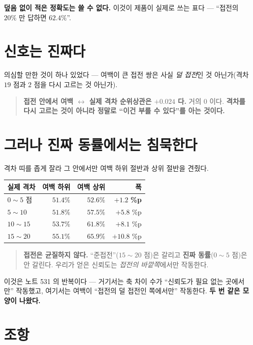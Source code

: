 \documentclass[11pt]{article}
\begin{document}
\textbf{덮음 없이 적은 정확도는 쓸 수 없다.} 이것이 제품이 실제로 쓰는 표다
--- ``접전의 $20\%$ 만 답하면 $62.4\%$''.

\section{신호는 진짜다}

의심할 만한 것이 하나 있었다 --- 여백이 큰 접전 쌍은 사실 \emph{덜 접전}인
것 아닌가(격차 $19$ 점과 $2$ 점을 다시 고르는 것 아닌가).

\begin{quote}
\textbf{접전 안에서 여백 $\leftrightarrow$ 실제 격차 순위상관은
$\mathbf{+0.024}$ 다.} 거의 $0$ 이다. \textbf{격차를 다시 고르는 것이 아니라
정말로 ``이건 부를 수 있다''를 아는 것이다.}
\end{quote}

\section{그러나 진짜 동률에서는 침묵한다}

격차 띠를 좁게 잘라 그 안에서만 여백 하위 절반과 상위 절반을 견줬다.

\begin{center}
\begin{tabular}{lrrr}
\hline
실제 격차 & 여백 하위 & 여백 상위 & 폭 \\
\hline
$0\!\sim\!5$ 점 & $51.4\%$ & $52.6\%$ & $\mathbf{+1.2}$ \textbf{\%p} \\
$5\!\sim\!10$ & $51.8\%$ & $57.5\%$ & $+5.8$ \%p \\
$10\!\sim\!15$ & $53.7\%$ & $61.8\%$ & $+8.1$ \%p \\
$15\!\sim\!20$ & $55.1\%$ & $65.9\%$ & $+10.8$ \%p \\
\hline
\end{tabular}
\end{center}

\begin{quote}
\textbf{접전은 균질하지 않다.} ``준접전''($15\!\sim\!20$ 점)은 갈리고
\textbf{진짜 동률}($0\!\sim\!5$ 점)은 안 갈린다. 우리가 얻은 신뢰도는
\emph{접전의 바깥쪽}에서만 작동한다.
\end{quote}

이것은 노트 531 의 반복이다 --- 거기서는 축 차이 수가 ``신뢰도가 필요 없는
곳에서만'' 작동했고, 여기서는 여백이 ``접전의 덜 접전인 쪽에서만'' 작동한다.
\textbf{두 번 같은 모양이 나왔다.}

\section*{조항}
\end{document}
